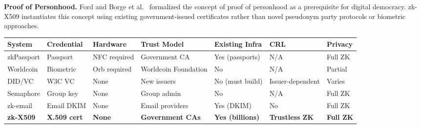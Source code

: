 \documentclass[11pt, a4paper]{article}
\begin{document}
\textbf{Proof of Personhood.} Ford \cite{ref20} and Borge et al.~\cite{ref21}
formalized the concept of proof of personhood as a prerequisite for
digital democracy. zk-X509 instantiates this concept using existing
government-issued certificates rather than novel pseudonym party
protocols or biometric approaches.

\begin{longtable}[]{@{}
  >{\raggedright\arraybackslash}p{}
  >{\raggedright\arraybackslash}p{}
  >{\raggedright\arraybackslash}p{}
  >{\raggedright\arraybackslash}p{}
  >{\raggedright\arraybackslash}p{}
  >{\raggedright\arraybackslash}p{}
  >{\raggedright\arraybackslash}p{}@{}}
\toprule\noalign{}
\begin{minipage}[b]{\linewidth}\raggedright
System
\end{minipage} & \begin{minipage}[b]{\linewidth}\raggedright
Credential
\end{minipage} & \begin{minipage}[b]{\linewidth}\raggedright
Hardware
\end{minipage} & \begin{minipage}[b]{\linewidth}\raggedright
Trust Model
\end{minipage} & \begin{minipage}[b]{\linewidth}\raggedright
Existing Infra
\end{minipage} & \begin{minipage}[b]{\linewidth}\raggedright
CRL
\end{minipage} & \begin{minipage}[b]{\linewidth}\raggedright
Privacy
\end{minipage} \\
\midrule\noalign{}
\endhead
\bottomrule\noalign{}
\endlastfoot
zkPassport \cite{ref2} & Passport & NFC required & Government CA & Yes
(passports) & N/A & Full ZK \\
Worldcoin \cite{ref3} & Biometric & Orb required & Worldcoin Foundation & No
& N/A & Partial \\
DID/VC \cite{ref13} & W3C VC & None & New issuers & No (must build) &
Issuer-dependent & Varies \\
Semaphore \cite{ref8} & Group key & None & Group admin & No & N/A & Full
ZK \\
zk-email \cite{ref9} & Email DKIM & None & Email providers & Yes (DKIM) & No
& Full ZK \\
\textbf{zk-X509} & \textbf{X.509 cert} & \textbf{None} &
\textbf{Government CAs} & \textbf{Yes (billions)} & \textbf{Trustless
ZK} & \textbf{Full ZK} \\
\end{longtable}
\end{document}
